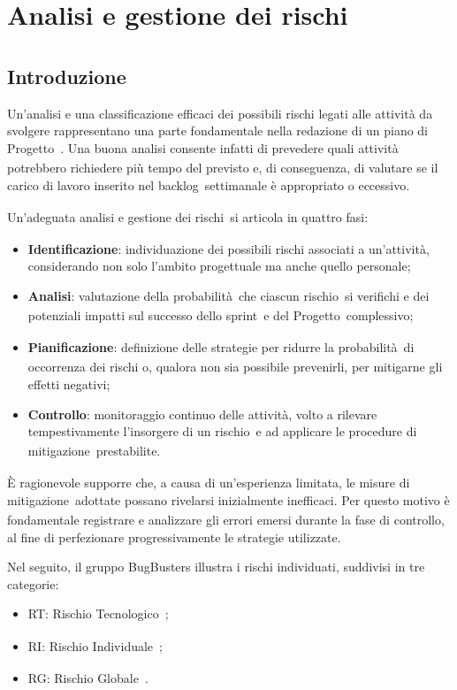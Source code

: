 \documentclass[a4paper,12pt]{article}
\newcommand{\pediceG}{\texorpdfstring{\textsubscript{\scalebox{0.6}{\textbf{G}}}~}{G}}
\begin{document}
\newpage

\section{Analisi e gestione dei rischi\pediceG}

\subsection{Introduzione}
Un'analisi e una classificazione efficaci dei possibili rischi legati alle attività da svolgere rappresentano una parte fondamentale nella redazione di un piano di Progetto\pediceG. Una buona analisi consente infatti di prevedere quali attività potrebbero richiedere più tempo del previsto e, di conseguenza, di valutare se il carico di lavoro inserito nel backlog\pediceG settimanale è appropriato o eccessivo.

Un'adeguata analisi e gestione dei rischi\pediceG si articola in quattro fasi:
\begin{itemize}
\item \textbf{Identificazione}: individuazione dei possibili rischi associati a un'attività, considerando non solo l'ambito progettuale ma anche quello personale;
\item \textbf{Analisi}: valutazione della probabilità\pediceG che ciascun rischio\pediceG si verifichi e dei potenziali impatti sul successo dello sprint\pediceG e del Progetto\pediceG complessivo;
\item \textbf{Pianificazione}: definizione delle strategie per ridurre la probabilità\pediceG di occorrenza dei rischi o, qualora non sia possibile prevenirli, per mitigarne gli effetti negativi;
\item \textbf{Controllo}: monitoraggio continuo delle attività, volto a rilevare tempestivamente l'insorgere di un rischio\pediceG e ad applicare le procedure di mitigazione\pediceG prestabilite.
\end{itemize}

È ragionevole supporre che, a causa di un'esperienza limitata, le misure di mitigazione\pediceG adottate possano rivelarsi inizialmente inefficaci. Per questo motivo è fondamentale registrare e analizzare gli errori emersi durante la fase di controllo, al fine di perfezionare progressivamente le strategie utilizzate.

Nel seguito, il gruppo BugBusters illustra i rischi individuati, suddivisi in tre categorie:
\begin{itemize}
\item RT: Rischio Tecnologico\pediceG;
\item RI: Rischio Individuale\pediceG;
\item RG: Rischio Globale\pediceG.
\end{itemize}
\end{document}
